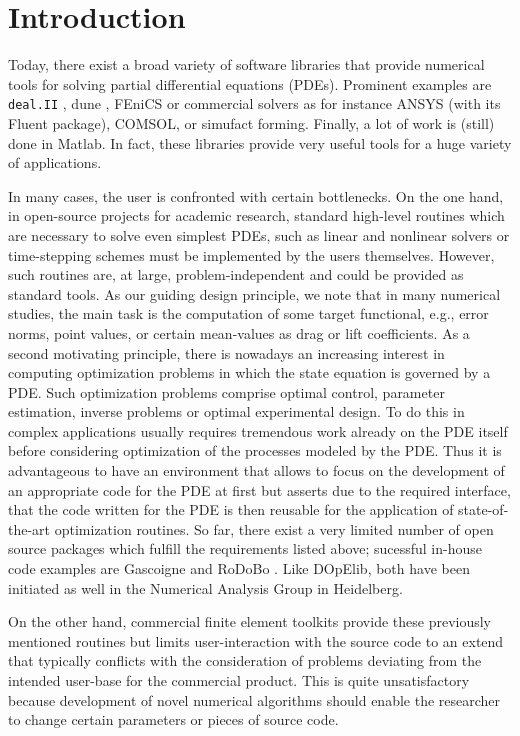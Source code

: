 \documentclass[smallextended]{svjour3}       %
\numberwithin{equation}{section}
\newcommand{\deal}{\texttt{deal.II}}
\begin{document}
\section{Introduction}
\label{introduction}
Today, there exist a broad variety of software libraries
that provide numerical tools for solving partial differential
equations (PDEs). Prominent examples are 
\deal{} \citep{dealnew}, dune \citep{dune}, 
FEniCS \citep{fenics}
or commercial solvers as for instance ANSYS (with its Fluent package),
COMSOL, or simufact forming.
Finally, a lot of work is (still) done in Matlab.
In fact, these libraries provide very useful tools 
for a huge variety of applications. 

In many cases, the user is confronted with 
certain bottlenecks. On the one hand, 
in open-source projects for academic research, 
standard high-level routines 
which are necessary to solve even simplest PDEs,
such as linear and nonlinear solvers or time-stepping schemes must be implemented 
by the users themselves. However, such routines are, at large,
problem-independent and could be provided as standard tools. 
As our guiding design principle, we note that in many 
numerical studies, the main task is the computation of some  
target functional, e.g., error norms,
point values, or certain mean-values as drag or lift coefficients.
As a second motivating principle, 
there is nowadays an increasing interest in computing 
optimization problems in which the state equation is governed 
by a PDE. Such optimization problems comprise optimal control,
parameter estimation, inverse problems or optimal experimental design. 
To do this in complex applications usually requires tremendous work already
on the PDE itself before considering optimization of the processes modeled 
by the PDE. Thus it is advantageous to have an environment that allows to 
focus on the development of an appropriate code for the PDE at first but 
asserts due to the required interface, that the code written for the PDE
is then reusable for the application of state-of-the-art optimization 
routines.
So far, there exist a very limited number of open source packages
which fulfill the requirements listed above; 
sucessful in-house code examples are Gascoigne \cite{gascoigne}
and RoDoBo \cite{rodobo}. 
Like DOpElib, both have been initiated as well in 
the Numerical Analysis Group in Heidelberg.

On the other hand, commercial finite element toolkits provide these 
previously mentioned routines but limits user-interaction
with the source code to an extend that typically conflicts
with the consideration of problems deviating from the intended 
user-base for the commercial product. 
This is quite unsatisfactory because development of novel numerical 
algorithms should enable the researcher
to change certain parameters or pieces of source code. 
\end{document}
